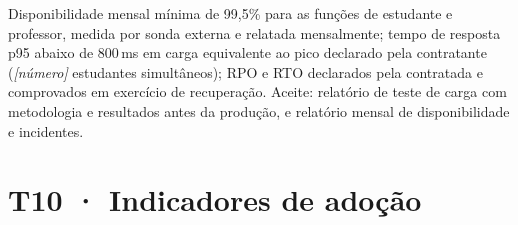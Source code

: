 \begin{paraotr}
Disponibilidade mensal mínima de 99,5\% para as funções de estudante e
professor, medida por sonda externa e relatada mensalmente; tempo de resposta
p95 abaixo de 800\,ms em carga equivalente ao pico declarado pela contratante
(\textit{[número]} estudantes simultâneos); RPO e RTO declarados pela
contratada e comprovados em exercício de recuperação. Aceite: relatório de
teste de carga com metodologia e resultados antes da produção, e relatório
mensal de disponibilidade e incidentes.
\end{paraotr}

\section{T10 · Indicadores de adoção}
\label{sec:t10}

